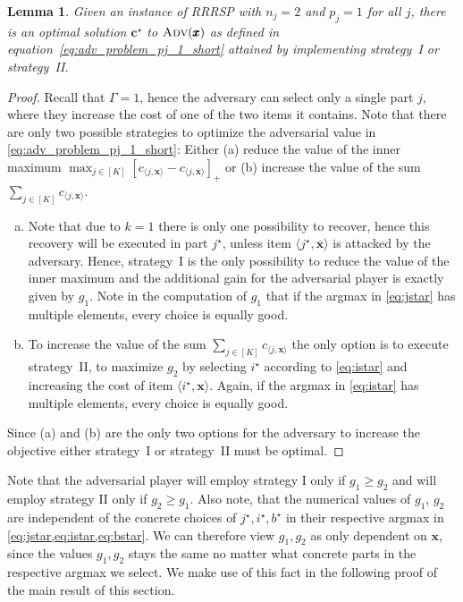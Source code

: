 \documentclass[a4paper,11pt,abstracton]{scrartcl}
\newtheorem{lem}{Lemma}%
\theoremstyle{definition}
\theoremstyle{remark}
\begin{document}
\begin{lem}
\label{lemma:strategy}
Given an instance of RRRSP with $n_j = 2$ and $p_j = 1$ for all $j$, 
there is an optimal solution $\pmb{c}^\star$ to $\textsc{Adv}(\pmb{x})$ 
as defined in equation~\eqref{eq:adv_problem_pj_1_short}
attained by implementing strategy~I or strategy~II.
\end{lem}
\begin{proof}
Recall that $\Gamma=1$, hence the adversary can select only a single part $j$, where they increase the cost of one of the two items it contains. Note that there are only two possible strategies to optimize the adversarial value in \cref{eq:adv_problem_pj_1_short}:
Either (a) reduce the value of the inner maximum $\max_{j\in[K]} [c_{\langle j, \pmb{x} \rangle} - c_{\langle j, \overline{\pmb{x}} \rangle}]_+$
or (b) increase the value of the sum $\sum_{j\in[K]} c_{\langle j, \pmb{x} \rangle}$.
\begin{enumerate}[(a)]

  \item Note that due to $k=1$ there is only one possibility to recover, hence 
    this recovery will be executed in part $j^\star$, unless item $\langle j^\star,\overline{\pmb{x}}\rangle$ is 
    attacked by the adversary. Hence, strategy~I is the only possibility to reduce the value 
    of the inner maximum and the additional gain for the adversarial player is exactly given by $g_1$.
    Note in the computation of $g_1$ that if the argmax in \cref{eq:jstar} has multiple elements, every choice is equally good.

  \item To increase the value of the sum $\sum_{j\in[K]} c_{\langle j, \pmb{x} \rangle}$ the only 
    option is to execute strategy~II, to maximize $g_2$ by selecting $i^\star$ according to \cref{eq:istar}
    and increasing the cost of  item $\langle i^\star,\pmb{x}\rangle$. Again, if the argmax in \cref{eq:istar} has multiple elements, every choice is equally good.
\end{enumerate}
Since (a) and (b) are the only two options for the adversary to increase 
the objective either strategy~I or strategy~II must be optimal.
\end{proof}

Note that the adversarial player will employ strategy I only if $g_1 \geq g_2$ and will employ strategy II only if $g_2\geq g_1$. Also note, that the numerical values of $g_1$, $g_2$ are independent of the concrete choices of $j^\star, i^\star, b^\star$ in their respective argmax in \cref{eq:jstar,eq:istar,eq:bstar}. We can therefore view $g_1, g_2$ as only dependent on $\pmb x$, since the values $g_1, g_2$ stays the same no matter what concrete parts in the respective argmax we select.
We make use of this fact in the following proof of the main result of this section.
\end{document}
